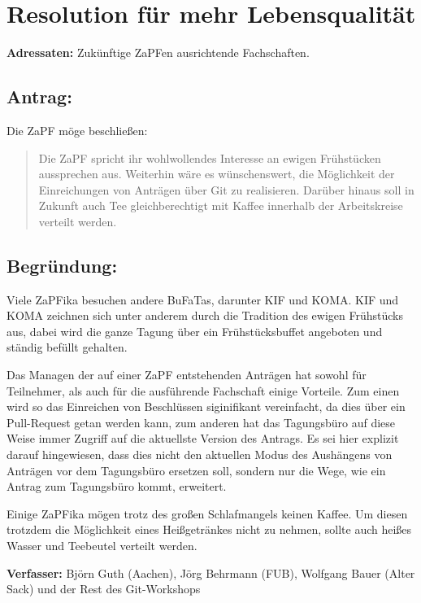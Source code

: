 \documentclass[12pt,oneside]{scrartcl}
\begin{document}
\section*{Resolution für mehr Lebensqualität}

\textbf{Adressaten:} Zukünftige ZaPFen ausrichtende Fachschaften.

\subsection*{Antrag:}
Die ZaPF möge beschließen:
\begin{quote}
Die ZaPF spricht ihr wohlwollendes Interesse an ewigen Frühstücken
aussprechen aus. Weiterhin wäre es wünschenswert, die Möglichkeit der Einreichungen von
Anträgen über Git zu realisieren. Darüber hinaus soll in Zukunft auch Tee
gleichberechtigt mit Kaffee innerhalb der Arbeitskreise verteilt werden.
\end{quote}

\subsection*{Begründung:}
Viele ZaPFika besuchen andere BuFaTas, darunter KIF und KOMA.
KIF und KOMA zeichnen sich unter anderem durch die Tradition des ewigen
Frühstücks aus, dabei wird die ganze Tagung über ein Frühstücksbuffet
angeboten und ständig befüllt gehalten.

Das Managen der auf einer ZaPF entstehenden Anträgen hat sowohl für Teilnehmer,
als auch für die ausführende Fachschaft einige Vorteile. Zum einen wird so das
Einreichen von Beschlüssen siginifikant vereinfacht, da dies über ein Pull-Request
getan werden kann, zum anderen hat das Tagungsbüro auf diese Weise immer Zugriff
auf die aktuellste Version des Antrags. Es sei hier explizit darauf hingewiesen,
dass dies nicht den aktuellen Modus des Aushängens von Anträgen vor dem Tagungsbüro
ersetzen soll, sondern nur die Wege, wie ein Antrag zum Tagungsbüro kommt,
erweitert.

Einige ZaPFika mögen trotz des großen Schlafmangels keinen Kaffee. Um diesen
trotzdem die Möglichkeit eines Heißgetränkes nicht zu nehmen, sollte auch heißes
Wasser und Teebeutel verteilt werden.

\vspace{1cm}
\textbf{Verfasser:} Björn Guth (Aachen), Jörg Behrmann (FUB), Wolfgang Bauer (Alter Sack)
und der Rest des Git-Workshops
\end{document}
